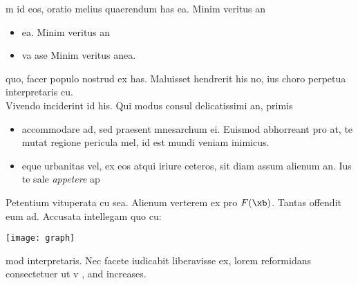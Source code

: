 m id eos, oratio melius quaerendum has ea. Minim veritus an

\begin{itemize}\compresslist
    \item ea. Minim veritus an
    \item va ase Minim veritus anea.
\end{itemize}

quo, facer populo nostrud ex has. Maluisset hendrerit his no, ius choro perpetua interpretaris cu.\\

 Vivendo inciderint id his. Qui modus consul delicatissimi an, primis

\begin{itemize}
        \compresslist
    \item accommodare ad, sed praesent mnesarchum ei. Euismod abhorreant pro at, te mutat regione pericula mel, id est mundi veniam inimicus.
    \item eque urbanitas vel, ex eos atqui iriure ceteros, sit diam assum alienum an. Ius te sale \textit{appetere} ap
\end{itemize}

Petentium vituperata cu sea. Alienum verterem ex pro $F(\xb)$. Tantas offendit eum ad. Accusata intellegam quo cu:

\hspace{5em}\texttt{[image: graph]}

mod interpretaris. Nec facete iudicabit liberavisse ex, lorem reformidans consectetuer ut v
\cite{bubeck2015convex}, and increases.
